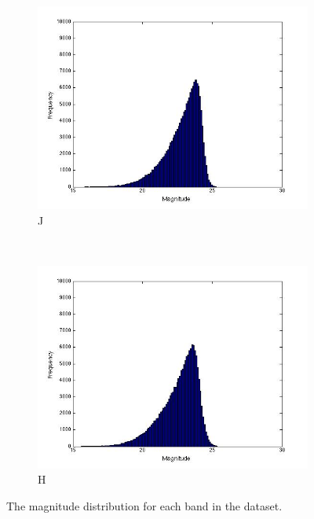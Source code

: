 \documentclass[useAMS,usenatbib,fleqn]{mn2e}
\begin{document}
\begin{figure}
\begin{subfigure}[b]{0.2\textwidth}
                \includegraphics[trim = 35px 15px 50px 25px, clip=true,width=\textwidth]{J.jpg}
                \caption{J}
        \end{subfigure}
         ~
        \begin{subfigure}[b]{0.2\textwidth}
                \includegraphics[trim = 35px 15px 50px 25px, clip=true,width=\textwidth]{H.jpg}
                \caption{H}
        \end{subfigure}
        
       \caption{The magnitude distribution for each band in the dataset.} 
	\label{fig-bands-histograms}
\end{figure}
\end{document}

